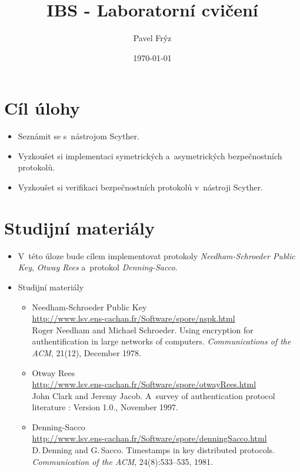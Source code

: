 \documentclass[a4paper,final]{article}
\title{\bfseries{IBS - Laboratorní cvičení}}
\date{\today}
\author{Pavel Frýz}
\begin{document}
\maketitle      %

\section*{Cíl úlohy}
\begin{itemize}
  \item Seznámit se s~nástrojom Scyther.
  \item Vyzkoušet si implementaci symetrických a~asymetrických bezpečnostních protokolů.
  \item Vyzkoušet si verifikaci bezpečnostních protokolů v~nástroji Scyther.
\end{itemize}

\section*{Studijní materiály}
\begin{itemize}
  \item V~této úloze bude cílem implementovat protokoly
  \emph{Needham-Schroeder Public Key}, \emph{Otway Rees} a~protokol \emph{Denning-Sacco}.
  \item Studijní materiály
    \begin{itemize}
      \item Needham-Schroeder Public Key\\
      \url{http://www.lsv.ens-cachan.fr/Software/spore/nspk.html}\\
      Roger Needham and Michael Schroeder. Using encryption for authentification
      in large networks of computers. \emph{Communications of the ACM}, 21(12), December
      1978.
      \item Otway Rees\\
      \url{http://www.lsv.ens-cachan.fr/Software/spore/otwayRees.html}\\
      John Clark and Jeremy Jacob. A~survey of authentication protocol literature : Version 1.0., November 1997.
      \item Denning-Sacco\\
      \url{http://www.lsv.ens-cachan.fr/Software/spore/denningSacco.html}\\
      D.\,Denning and G.\,Sacco. Timestamps in key distributed protocols.
      \emph{Communication of the ACM}, 24(8):533--535, 1981.
    \end{itemize}
\end{itemize}
\end{document}
